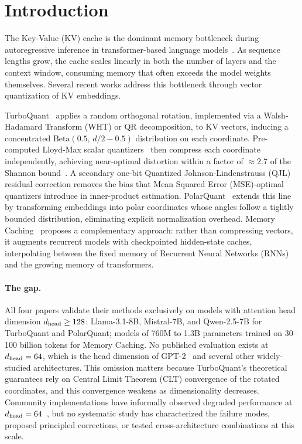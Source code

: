 
\section{Introduction}
\label{sec:introduction}

The Key-Value (KV) cache is the dominant memory bottleneck during
autoregressive inference in transformer-based language
models~\cite{radford2019gpt2}.
As sequence lengths grow, the cache scales linearly in both the number of
layers and the context window, consuming memory that often exceeds the
model weights themselves.
Several recent works address this bottleneck through vector quantization
of KV embeddings.

TurboQuant~\cite{zandieh2025turboquant} applies a random orthogonal
rotation, implemented via a Walsh-Hadamard Transform (WHT) or QR
decomposition, to KV vectors, inducing a concentrated
$\mathrm{Beta}(0.5,\, d/2 - 0.5)$ distribution on each coordinate.
Pre-computed Lloyd-Max scalar quantizers~\cite{lloyd1982least} then
compress each coordinate independently, achieving near-optimal
distortion within a factor of ${\approx}2.7$ of the Shannon
bound~\cite{shannon1959coding}.
A secondary one-bit Quantized Johnson-Lindenstrauss
(QJL)~\cite{zandieh2024qjl} residual correction removes the bias
that Mean Squared Error (MSE)-optimal quantizers introduce in inner-product
estimation.
PolarQuant~\cite{han2025polarquant} extends this line by transforming
embeddings into polar coordinates whose angles follow a tightly bounded
distribution, eliminating explicit normalization overhead.
Memory Caching~\cite{behrouz2026mc} proposes a complementary approach:
rather than compressing vectors, it augments recurrent models with
checkpointed hidden-state caches, interpolating between the fixed
memory of Recurrent Neural Networks (RNNs) and the growing memory of
transformers.

\paragraph{The gap.}
All four papers validate their methods exclusively on models with
attention head dimension $d_{\text{head}} \geq 128$: Llama-3.1-8B, Mistral-7B,
and Qwen-2.5-7B for TurboQuant and PolarQuant; models of 760M to 1.3B
parameters trained on 30--100 billion tokens for Memory Caching.
No published evaluation exists at $d_{\text{head}} = 64$, which is the head
dimension of GPT-2~\cite{radford2019gpt2} and several other
widely-studied architectures.
This omission matters because TurboQuant's theoretical guarantees rely on
Central Limit Theorem (CLT) convergence of the rotated coordinates,
and this convergence weakens as dimensionality decreases.
Community implementations have informally observed degraded performance
at $d_{\text{head}} = 64$~\cite{amesianx2025turboquant, onlyterp2025turboquant},
but no systematic study has characterized the failure modes, proposed
principled corrections, or tested cross-architecture combinations at
this scale.

